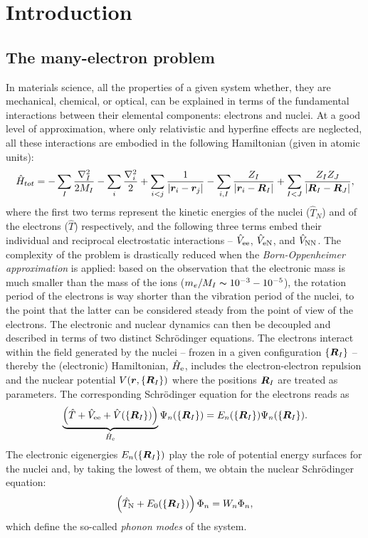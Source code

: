 \cleardoublepage
\chapter{Introduction\label{ch:introduction}}

\section{The many-electron problem}
In materials science, all the properties of a given system whether, they are mechanical, chemical, or optical, can be explained in terms of the fundamental interactions between their elemental components: electrons and nuclei. At a good level of approximation, where only relativistic and hyperfine effects are neglected, all these interactions are embodied in the following Hamiltonian (given in atomic units):
%
\begin{equation}
    \hat{H}_{tot} = - \sum_I \frac{\nabla_I^2}{2M_I} - \sum_i \frac{\nabla_i^2}{2} + \sum_{i < j} \frac{1}{|{\bm r}_i - {\bm r}_j|} - \sum_{i,I} \frac{Z_I}{|{\bm r}_i - {\bm R}_I|} + \sum_{I < J} \frac{Z_I Z_J}{|{\bm R}_I - {\bm R}_J|} ,
    \label{eq:many-body}
\end{equation}
%
where the first two terms represent the kinetic energies of the nuclei ($\hat{T}_N$) and of the electrons ($\hat{T}$) respectively, and the following three terms embed their individual and reciprocal electrostatic interactions -- $\hat{V}_{\rm ee}$, $\hat{V}_{\rm eN}$, and $\hat{V}_{\rm NN}$. The complexity of the problem is drastically reduced when the \emph{Born-Oppenheimer approximation} is applied: based on the observation that the electronic mass is much smaller than the mass of the ions ($m_e / M_I \thicksim 10^{-3} - 10^{-5}$), the rotation period of the electrons is way shorter than the vibration period of the nuclei, to the point that the latter can be considered steady from the point of view of the electrons. The electronic and nuclear dynamics can then be decoupled and described in terms of two distinct Schr\"{o}dinger equations. The electrons interact within the field generated by the nuclei -- frozen in a given configuration $\{ {\bm R}_I \}$ -- thereby the (electronic) Hamiltonian, $\hat{H}_{\rm e}$, includes the electron-electron repulsion and the nuclear potential $V({\bm r},\{ {\bm R}_I \})$ where the positions ${\bm R}_I$ are treated as parameters. The corresponding Schr\"{o}dinger equation for the electrons reads as
%
\begin{equation}
    \underbrace{\left( \hat{T} + \hat{V}_{\rm ee} + \hat{V}(\{ {\bm R}_I \}) \right)}_{\hat{H}_{\rm e}} \Psi_n(\{ {\bm R}_I \}) = E_n(\{ {\bm R}_I \}) \Psi_n(\{ {\bm R}_I \}) .
    \label{eq:many-electron-problem}
\end{equation}
%
The electronic eigenergies $E_n(\{ {\bm R}_I \})$ play the role of potential energy surfaces for the nuclei and, by taking the lowest of them, we obtain the nuclear Schr\"{o}dinger equation:
%
\begin{equation}
    \left( \hat{T}_{\rm N} + E_0(\{ {\bm R}_I \}) \right) \Phi_n = W_n \Phi_n ,
    \label{eq:nuclear-schrodinger-eq}
\end{equation}
%
which define the so-called \emph{phonon modes} of the system.

